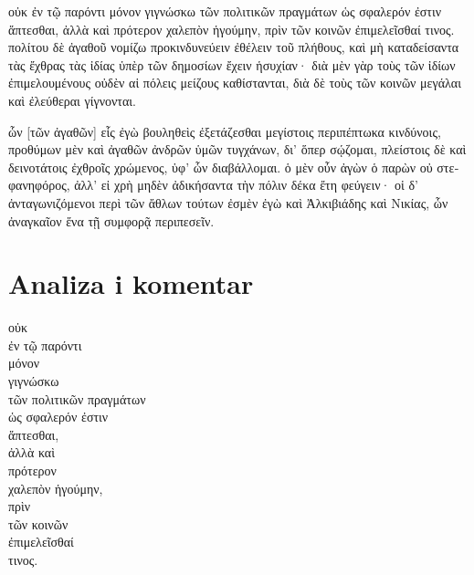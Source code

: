 {\large

\begin{greek}

\noindent οὐκ ἐν τῷ παρόντι μόνον γιγνώσκω τῶν πολιτικῶν πραγμάτων ὡς σφαλερόν ἐστιν ἅπτεσθαι, ἀλλὰ καὶ πρότερον χαλεπὸν ἡγούμην, πρὶν τῶν κοινῶν ἐπιμελεῖσθαί τινος. πολίτου δὲ ἀγαθοῦ νομίζω προκινδυνεύειν ἐθέλειν τοῦ πλήθους, καὶ μὴ καταδείσαντα τὰς ἔχθρας τὰς ἰδίας ὑπὲρ τῶν δημοσίων ἔχειν ἡσυχίαν· διὰ μὲν γὰρ τοὺς τῶν ἰδίων ἐπιμελουμένους οὐδὲν αἱ πόλεις μείζους καθίστανται, διὰ δὲ τοὺς τῶν κοινῶν μεγάλαι καὶ ἐλεύθεραι γίγνονται.

ὧν [τῶν ἀγαθῶν] εἷς ἐγὼ βουληθεὶς ἐξετάζεσθαι μεγίστοις περιπέπτωκα κινδύνοις, προθύμων μὲν καὶ ἀγαθῶν ἀνδρῶν ὑμῶν τυγχάνων, δι' ὅπερ σῴζομαι, πλείστοις δὲ καὶ δεινοτάτοις ἐχθροῖς χρώμενος, ὑφ' ὧν διαβάλλομαι. ὁ μὲν οὖν ἀγὼν ὁ παρὼν οὐ στεφανηφόρος, ἀλλ' εἰ χρὴ μηδὲν ἀδικήσαντα τὴν πόλιν δέκα ἔτη φεύγειν· οἱ δ' ἀνταγωνιζόμενοι περὶ τῶν ἄθλων τούτων ἐσμὲν ἐγὼ καὶ Ἀλκιβιάδης καὶ Νικίας, ὧν ἀναγκαῖον ἕνα τῇ συμφορᾷ περιπεσεῖν.

\end{greek}

}


\section*{Analiza i komentar}


{\large
\begin{greek}
\noindent οὐκ \\
\tabto{2em} ἐν τῷ παρόντι \\
μόνον \\
γιγνώσκω \\

\tabto{6em} τῶν πολιτικῶν πραγμάτων \\
\tabto{2em} ὡς σφαλερόν ἐστιν \\
\tabto{4em} ἅπτεσθαι, \\
ἀλλὰ καὶ \\
\tabto{2em} πρότερον \\
χαλεπὸν ἡγούμην, \\
\tabto{2em} πρὶν \\
\tabto{6em} τῶν κοινῶν \\
\tabto{2em} ἐπιμελεῖσθαί \\
\tabto{4em} τινος.\\

\end{greek}
}

